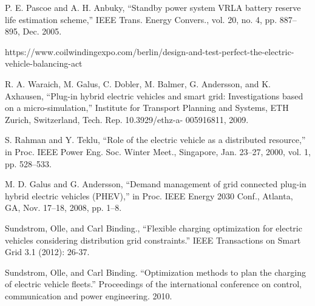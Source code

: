 P. E. Pascoe and A. H. Anbuky, ``Standby power system VRLA battery
reserve life estimation scheme,'' IEEE Trans. Energy Convers., vol. 20,
no. 4, pp. 887–895, Dec. 2005.
  
  https://www.coilwindingexpo.com/berlin/design-and-test-perfect-the-electric-vehicle-balancing-act
  
  R. A. Waraich, M. Galus, C. Dobler, M. Balmer, G. Andersson, and K.
Axhausen, ``Plug-in hybrid electric vehicles and smart grid: Investigations
based on a micro-simulation,'' Institute for Transport Planning
and Systems, ETH Zurich, Switzerland, Tech. Rep. 10.3929/ethz-a-
005916811, 2009.

S. Rahman and Y. Teklu, ``Role of the electric vehicle as a distributed
resource,'' in Proc. IEEE Power Eng. Soc. Winter Meet., Singapore,
Jan. 23–27, 2000, vol. 1, pp. 528–533.

 M. D. Galus and G. Andersson, ``Demand management of grid connected
plug-in hybrid electric vehicles (PHEV),'' in Proc. IEEE Energy
2030 Conf., Atlanta, GA, Nov. 17–18, 2008, pp. 1–8.

Sundstrom, Olle, and Carl Binding., ``Flexible charging optimization for electric vehicles considering distribution grid constraints.'' IEEE Transactions on Smart Grid 3.1 (2012): 26-37.

Sundstrom, Olle, and Carl Binding. ``Optimization methods to plan the charging of electric vehicle fleets.'' Proceedings of the international conference on control, communication and power engineering. 2010.


